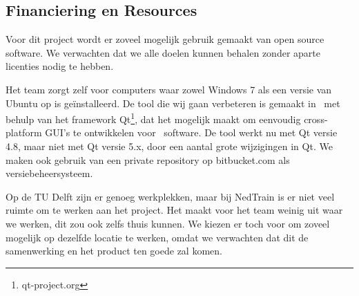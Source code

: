 \subsection{Financiering en Resources}
Voor dit project wordt er zoveel mogelijk gebruik gemaakt van open source software. We verwachten dat we alle doelen kunnen behalen zonder aparte licenties nodig te hebben.

Het team zorgt zelf voor computers waar zowel Windows 7 als een versie van Ubuntu op is ge\"installeerd. De tool die wij gaan verbeteren is gemaakt in \cpp\ met behulp van het framework Qt\footnote{qt-project.org}, dat het mogelijk maakt om eenvoudig cross-platform GUI's te ontwikkelen voor \cpp\ software. De tool werkt nu met Qt versie 4.8, maar niet met Qt versie 5.x, door een aantal grote wijzigingen in Qt. We maken ook gebruik van een private repository op bitbucket.com als versiebeheersysteem.

Op de TU Delft zijn er genoeg werkplekken, maar bij NedTrain is er niet veel ruimte om te werken aan het project. Het maakt voor het team weinig uit waar we werken, dit zou ook zelfs thuis kunnen. We kiezen er toch voor om zoveel mogelijk op dezelfde locatie te werken, omdat we verwachten dat dit de samenwerking en het product ten goede zal komen. 
